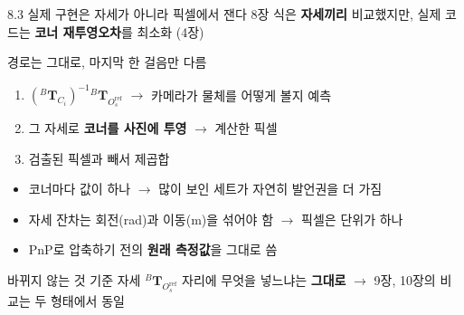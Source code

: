 \documentclass[aspectratio=169,11pt]{beamer}
\newcommand{\T}[3][]{{}^{#2}\mathbf{T}^{#1}_{#3}}   %
\newcommand{\Oref}{O^{\mathrm{ref}}}   %
\begin{document}
\begin{frame}{8.3 실제 구현은 자세가 아니라 픽셀에서 잰다}
  8장 식은 \textbf{자세끼리} 비교했지만, 실제 코드는
  \textbf{코너 재투영오차}를 최소화 (4장)
  \vfill
  \begin{block}{경로는 그대로, 마지막 한 걸음만 다름}
    \begin{enumerate}
      \item $\left(\T{B}{C_i}\right)^{-1}\T{B}{\Oref_s}$
        $\rightarrow$ 카메라가 물체를 어떻게 볼지 예측
      \item 그 자세로 \textbf{코너를 사진에 투영} $\rightarrow$ 계산한 픽셀
      \item 검출된 픽셀과 빼서 제곱합
    \end{enumerate}
  \end{block}
  \vfill
  \begin{itemize}
    \item 코너마다 값이 하나 $\rightarrow$ 많이 보인 세트가 자연히 발언권을 더 가짐
    \item 자세 잔차는 회전(rad)과 이동(m)을 섞어야 함
      $\rightarrow$ 픽셀은 단위가 하나
    \item PnP로 압축하기 전의 \textbf{원래 측정값}을 그대로 씀
  \end{itemize}
  \vfill
  \begin{alertblock}{바뀌지 않는 것}
    기준 자세 $\T{B}{\Oref_s}$ 자리에 무엇을 넣느냐는 \textbf{그대로}
    $\rightarrow$ 9장, 10장의 비교는 두 형태에서 동일
  \end{alertblock}
\end{frame}
\end{document}
